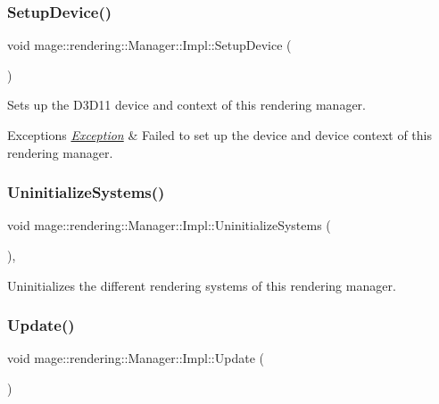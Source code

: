 \subsubsection{\texorpdfstring{Setup\+Device()}{SetupDevice()}}
{\footnotesize\ttfamily void mage\+::rendering\+::\+Manager\+::\+Impl\+::\+Setup\+Device (\begin{DoxyParamCaption}{ }\end{DoxyParamCaption})\hspace{0.3cm}{\ttfamily [private]}}

Sets up the D3\+D11 device and context of this rendering manager.


\begin{DoxyExceptions}{Exceptions}
{\em \mbox{\hyperlink{classmage_1_1_exception}{Exception}}} & Failed to set up the device and device context of this rendering manager. \\
\hline
\end{DoxyExceptions}
\mbox{\label{classmage_1_1rendering_1_1_manager_1_1_impl_a0e2979e4330a5148da2fa6cabd19078f}} 
\subsubsection{\texorpdfstring{Uninitialize\+Systems()}{UninitializeSystems()}}
{\footnotesize\ttfamily void mage\+::rendering\+::\+Manager\+::\+Impl\+::\+Uninitialize\+Systems (\begin{DoxyParamCaption}{ }\end{DoxyParamCaption})\hspace{0.3cm}{\ttfamily [private]}, {\ttfamily [noexcept]}}

Uninitializes the different rendering systems of this rendering manager. \mbox{\label{classmage_1_1rendering_1_1_manager_1_1_impl_a8fd123eb4cc188a207ca0bb9824c3f59}} 
\subsubsection{\texorpdfstring{Update()}{Update()}}
{\footnotesize\ttfamily void mage\+::rendering\+::\+Manager\+::\+Impl\+::\+Update (\begin{DoxyParamCaption}{ }\end{DoxyParamCaption})}

